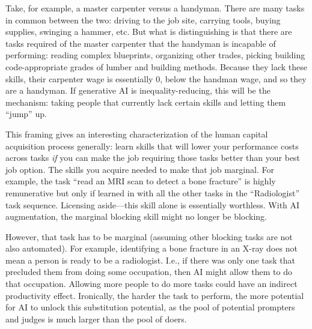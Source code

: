 \documentclass{article}
\begin{document}
Take, for example, a master carpenter versus a handyman.
There are many tasks in common between the two: driving to the job site, carrying tools, buying supplies, swinging a hammer, etc.
But what is distinguishing is that there are tasks required of the master carpenter that the handyman is incapable of performing: 
reading complex blueprints, organizing other trades, picking building code-appropriate grades of lumber and building methods.
Because they lack these skills, their carpenter wage is essentially 0, below the handman wage, and so they are a handyman.
If generative AI is inequality-reducing, this will be the mechanism: taking people that currently lack certain skills and letting them ``jump'' up. 

This framing gives an interesting characterization of the human capital acquisition process generally: 
learn skills that will lower your performance costs across tasks \emph{if} you can make the job requiring those tasks better than your best job option.
The skills you acquire needed to make that job marginal. 
For example, the task ``read an MRI scan to detect a bone fracture'' is highly remunerative but only if learned in with all the other tasks in the ``Radiologist'' task sequence.
Licensing aside---this skill alone is essentially worthless.  
With AI augmentation, the marginal blocking skill might no longer be blocking. 

However, that task has to be marginal (assuming other blocking tasks are not also automated). 
For example, identifying a bone fracture in an X-ray does not mean a person is ready to be a radiologist.
I.e., if there was only one task that precluded them from doing some occupation, then AI might allow them to do that occupation.
Allowing more people to do more tasks could have an indirect productivity effect. 
Ironically, the harder the task to perform, the more potential for AI to unlock this substitution potential, as the pool of potential prompters and judges is much larger than the pool of doers.
\end{document}
